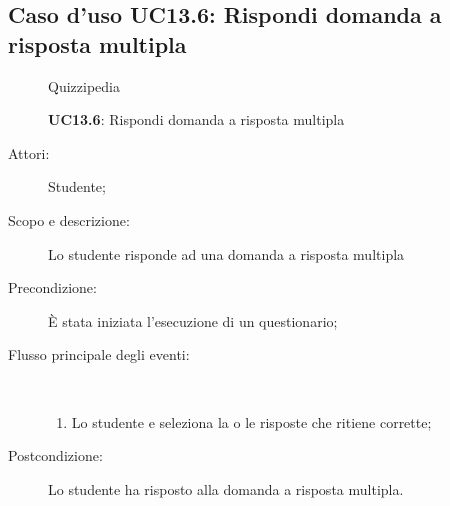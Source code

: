 \subsection{Caso d'uso UC13.6: Rispondi domanda a risposta multipla}
	\begin{figure}[H]
		\centering
		\begin{resizedtikzpicture}{\textwidth}
		\begin{umlsystem}[x=0, fill=lightgray!20]{Quizzipedia}
		\end{umlsystem}
		\end{resizedtikzpicture}
		\caption{\textbf{UC13.6}: Rispondi domanda a risposta multipla}
		\label{UC13.6}
	\end{figure}
\begin{description}
\item[Attori:] Studente;
\item[Scopo e descrizione:] Lo studente risponde ad una domanda a risposta multipla
      \item[Precondizione:] È stata iniziata l'esecuzione di un questionario;

        \item[Flusso principale degli eventi:] \ 
 \begin{enumerate}
          \item Lo studente e seleziona la o le risposte che ritiene corrette;

      \end{enumerate}
    \item[Postcondizione:] Lo studente ha risposto alla domanda a risposta multipla.
  \end{description}
\hypertarget{UC13.7}{}
